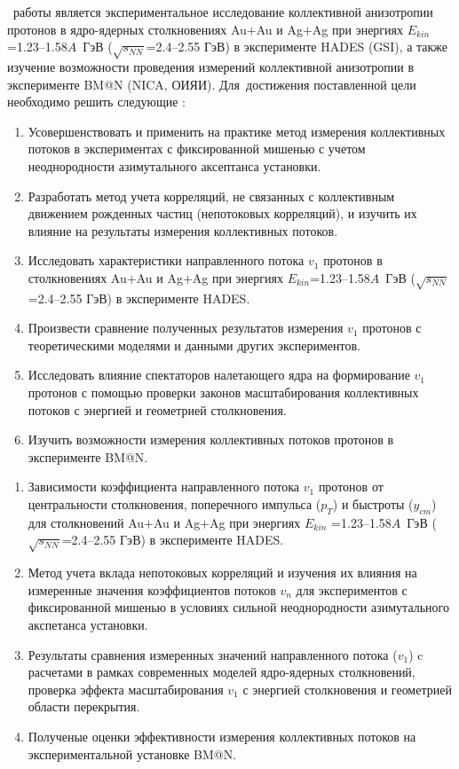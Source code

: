 \aim\ работы является экспериментальное исследование коллективной анизотропии протонов в ядро-ядерных столкновениях  Au$+$Au и Ag$+$Ag при энергиях $E_{kin}$=1.23--1.58$A$~ГэВ ($\sqrt{s_{NN}}$=2.4--2.55 ГэВ) в эксперименте HADES (GSI), а также  изучение возможности проведения измерений коллективной анизотропии в эксперименте BM@N (NICA, ОИЯИ).
Для~достижения поставленной цели необходимо решить следующие {\tasks}:
\begin{enumerate}
    \item  Усовершенствовать  и применить на практике  метод измерения коллективных потоков в экспериментах с фиксированной мишенью с учетом неоднородности азимутального аксептанса установки.

    \item  Разработать метод учета корреляций, не связанных с коллективным движением рожденных частиц (непотоковых корреляций), и изучить их влияние на результаты измерения коллективных потоков.

    \item  Исследовать характеристики  направленного потока $v_1$ протонов в столкновениях Au$+$Au и Ag$+$Ag при энергиях $E_{kin}$=1.23--1.58$A$~ГэВ ($\sqrt{s_{NN}}$=2.4--2.55 ГэВ) в эксперименте HADES.

    \item  Произвести  сравнение полученных результатов измерения $v_1$ протонов с теоретическими моделями и данными  других экспериментов.

    \item  Исследовать влияние спектаторов налетающего ядра на формирование $v_1$ протонов с помощью проверки законов масштабирования коллективных потоков с энергией и геометрией столкновения.

    \item  Изучить возможности измерения  коллективных потоков протонов в эксперименте BM@N.
\end{enumerate}
\begin{enumerate}
    \item Зависимости коэффициента направленного потока $v_1$  протонов от центральности столкновения, поперечного импульса ($p_T$) и быстроты  ($y_{cm}$) для 
    столкновений Au$+$Au и Ag$+$Ag при энергиях $E_{kin}$ =1.23--1.58$A$~ГэВ ($\sqrt{s_{NN}}$=2.4--2.55 ГэВ) в эксперименте HADES.
    
    \item Метод учета вклада непотоковых корреляций и изучения их влияния на измеренные значения  коэффициентов потоков $v_n$ для экспериментов с фиксированной мишенью в условиях сильной неоднородности азимутального акспетанса установки.

    \item Результаты сравнения измеренных значений направленного потока ($v_1$) c расчетами в рамках современных моделей ядро-ядерных столкновений, проверка эффекта масштабирования  $v_1$ с энергией столкновения и геометрией области перекрытия.

    \item Полученые оценки эффективности измерения коллективных потоков на экспериментальной установке BM@N.
\end{enumerate}
